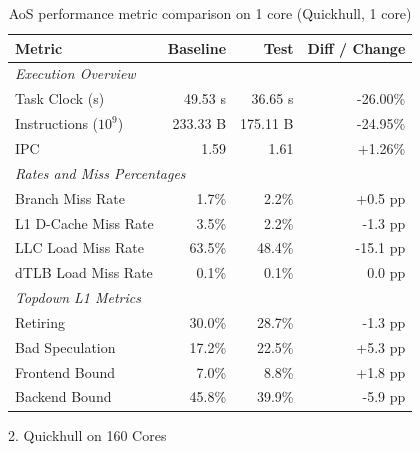    \begin{table}[htbp]
      \centering
      \caption{AoS performance metric comparison on 1 core (Quickhull, 1 core)}
      \label{tab:perf_comparison_aos_quickhull_1core}
      \begin{tabular}{lrrr}
        \toprule
        \textbf{Metric} & \textbf{Baseline} & \textbf{Test} & \textbf{Diff / Change} \\
        \midrule
        \multicolumn{4}{l}{\textit{Execution Overview}} \\
        \quad Task Clock (s)           & 49.53 s   & 36.65 s   & -26.00\%   \\
        \quad Instructions ($10^9$)    & 233.33 B  & 175.11 B  & -24.95\%   \\
        \quad IPC                      & 1.59       & 1.61       & +1.26\%    \\
        \midrule
        \multicolumn{4}{l}{\textit{Rates and Miss Percentages}} \\
        \quad Branch Miss Rate         & 1.7\%      & 2.2\%      & +0.5 pp    \\
        \quad L1 D-Cache Miss Rate     & 3.5\%      & 2.2\%      & -1.3 pp    \\
        \quad LLC Load Miss Rate       & 63.5\%     & 48.4\%     & -15.1 pp   \\
        \quad dTLB Load Miss Rate      & 0.1\%      & 0.1\%      & 0.0 pp     \\
        \midrule
        \multicolumn{4}{l}{\textit{Topdown L1 Metrics}} \\
        \quad Retiring                 & 30.0\%     & 28.7\%     & -1.3 pp   \\
        \quad Bad Speculation          & 17.2\%     & 22.5\%     & +5.3 pp   \\
        \quad Frontend Bound           & 7.0\%     & 8.8\%     & +1.8 pp   \\
        \quad Backend Bound            & 45.8\%     & 39.9\%     & -5.9 pp   \\
        \bottomrule
      \end{tabular}
    \end{table}

  2. Quickhull on 160 Cores


